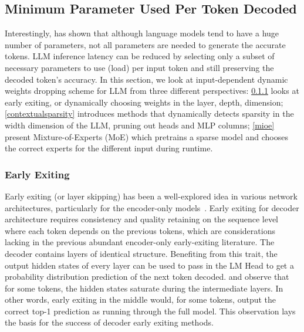 \subsection{Minimum Parameter Used Per Token Decoded} 
\label{fixedtoken} 

Interestingly, \cite{simoulin-crabbe-2021-many} has shown that although language models tend to have a huge number of parameters, not all parameters are needed to generate the accurate tokens. LLM inference latency can be reduced by selecting only a subset of necessary parameters to use (load) per input token and still preserving the decoded token's accuracy. In this section, we look at input-dependent dynamic weights dropping scheme for LLM from three different perspectives: \ref{earlyexit} looks at early exiting, or dynamically choosing weights in the layer, depth, dimension; \ref{contextualsparsity} introduces methods that dynamically detects sparsity in the width dimension of the LLM, pruning out heads and MLP columns; \ref{mioe} present Mixture-of-Experts (MoE) which pretrains a sparse model and chooses the correct experts for the different input during runtime. 


\subsubsection{Early Exiting} \label{earlyexit} 


Early exiting (or layer skipping) has been a well-explored idea in various network architectures, particularly for the encoder-only models~\citep{baierreinio2020node, hou2020dynabert, li2021cascadebert, liu2020fastbert, liu-etal-2022-towards-efficient, schwartz-etal-2020-right, stickland2019bert, xin2020deebert, zhou2020bert, zhu-2021-leebert, schuster2021consistent}.
Early exiting for decoder architecture requires consistency and quality retaining on the sequence level where each token depends on the previous tokens, which are considerations lacking in the previous abundant encoder-only early-exiting literature. 
The decoder contains layers of identical structure. Benefiting from this trait, the output hidden states of every layer can be used to pass in the LM Head to get a probability distribution prediction of the next token decoded. 
\cite{geva2022transformer} and \cite{simoulin-crabbe-2021-many} observe that for some tokens, the hidden states saturate during the intermediate layers. In other words, early exiting in the middle would, for some tokens, output the correct top-1 prediction as running through the full model. This observation lays the basis for the success of decoder early exiting methods. 

